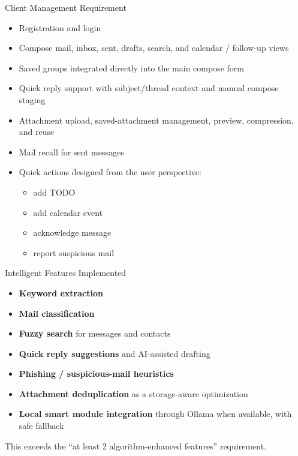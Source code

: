 \documentclass[aspectratio=169]{beamer}
\begin{document}
\begin{frame}{Client Management Requirement}
  \begin{itemize}
    \item Registration and login
    \item Compose mail, inbox, sent, drafts, search, and calendar / follow-up views
    \item Saved groups integrated directly into the main compose form
    \item Quick reply support with subject/thread context and manual compose staging
    \item Attachment upload, saved-attachment management, preview, compression, and reuse
    \item Mail recall for sent messages
    \item Quick actions designed from the user perspective:
    \begin{itemize}
      \item add TODO
      \item add calendar event
      \item acknowledge message
      \item report suspicious mail
    \end{itemize}
  \end{itemize}
\end{frame}

\begin{frame}{Intelligent Features Implemented}
  \begin{itemize}
    \item \textbf{Keyword extraction}
    \item \textbf{Mail classification}
    \item \textbf{Fuzzy search} for messages and contacts
    \item \textbf{Quick reply suggestions} and AI-assisted drafting
    \item \textbf{Phishing / suspicious-mail heuristics}
    \item \textbf{Attachment deduplication} as a storage-aware optimization
    \item \textbf{Local smart module integration} through Ollama when available, with safe fallback
  \end{itemize}

  \vspace{0.4em}
  This exceeds the ``at least 2 algorithm-enhanced features'' requirement.
\end{frame}
\end{document}
